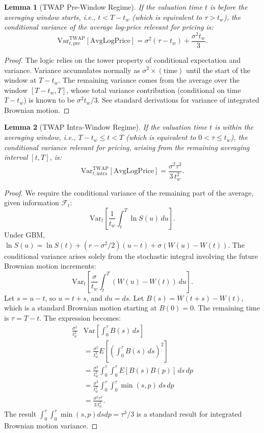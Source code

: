 \documentclass[11pt]{article}
\theoremstyle{plain}
\newtheorem{lemma}{Lemma}[section]
\begin{document}
\begin{lemma}[TWAP Pre-Window Regime] \label{lem:pre_window}
If the valuation time $t$ is before the averaging window starts, i.e., $t < T - t_w$ (which is equivalent to $\tau > t_w$), the conditional variance of the average log-price relevant for pricing is:
\[
  \mathrm{Var}_{t, \mathrm{pre}}^{\mathrm{TWAP}}[\text{AvgLogPrice}] = \sigma^2(\tau - t_w) + \frac{\sigma^2 t_w}{3}.
\]
\end{lemma}
\begin{proof}
  The logic relies on the tower property of conditional expectation and variance. Variance accumulates normally as $\sigma^2 \times (\text{time})$ until the start of the window at $T-t_w$. The remaining variance comes from the average over the window $[T-t_w, T]$, whose total variance contribution (conditional on time $T-t_w$) is known to be $\sigma^2 t_w / 3$. See standard derivations for variance of integrated Brownian motion.
\end{proof}

\begin{lemma}[TWAP Intra-Window Regime] \label{lem:intra_window}
If the valuation time $t$ is within the averaging window, i.e., $T - t_w \le t < T$ (which is equivalent to $0 < \tau \le t_w$), the conditional variance relevant for pricing, arising from the remaining averaging interval $[t, T]$, is:
\[
  \mathrm{Var}_{t, \mathrm{intra}}^{\mathrm{TWAP}}[\text{AvgLogPrice}] = \frac{\sigma^2 \tau^3}{3\,t_w^2}.
\]
\end{lemma}
\begin{proof}
  We require the conditional variance of the remaining part of the average, given information $\mathcal{F}_t$:
  \[
  \mathrm{Var}_t\left[ \frac{1}{t_w} \int_{t}^{T} \ln S(u) \,du \right].
  \]
  Under GBM, $\ln S(u) = \ln S(t) + (r-\sigma^2/2)(u-t) + \sigma (W(u)-W(t))$. The conditional variance arises solely from the stochastic integral involving the future Brownian motion increments:
  \[
  \mathrm{Var}_t\left[ \frac{\sigma}{t_w} \int_{t}^{T} (W(u)-W(t)) \,du \right].
  \]
  Let $s = u-t$, so $u = t+s$, and $du=ds$. Let $B(s) = W(t+s) - W(t)$, which is a standard Brownian motion starting at $B(0)=0$. The remaining time is $\tau = T-t$. The expression becomes:
  \begin{align*}
    \frac{\sigma^2}{t_w^2} &\mathrm{Var}\left[ \int_0^{\tau} B(s) \,ds \right] \\
    &= \frac{\sigma^2}{t_w^2} E\left[ \left( \int_0^{\tau} B(s) \,ds \right)^2 \right] \\
    &= \frac{\sigma^2}{t_w^2} \int_0^{\tau} \int_0^{\tau} E[B(s) B(p)] \,ds\,dp \\
    &= \frac{\sigma^2}{t_w^2} \int_0^{\tau} \int_0^{\tau} \min(s, p) \,ds\,dp \\
    &= \frac{\sigma^2 \tau^3}{3\,t_w^2}.
  \end{align*}
  The result $\int_0^\tau \int_0^\tau \min(s,p) ds dp = \tau^3/3$ is a standard result for integrated Brownian motion variance.
\end{proof}
\end{document}
